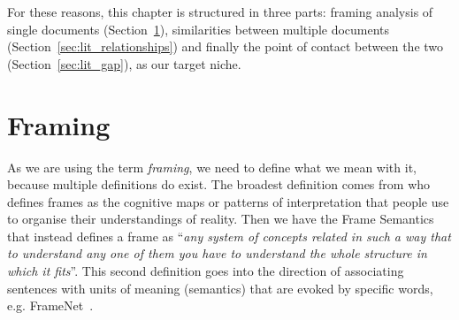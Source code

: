 
For these reasons, this chapter is structured in three parts: framing analysis of single documents (Section~\ref{sec:lit_framing}), similarities between multiple documents (Section~\ref{sec:lit_relationships}) and finally the point of contact between the two (Section~\ref{sec:lit_gap}), as our target niche.


\section{Framing}
\label{sec:lit_framing}

As we are using the term \emph{framing}, we need to define what we mean with it, because multiple definitions do exist.
The broadest definition comes from \citet{goffman1974frame} who defines frames as
the cognitive maps or patterns of interpretation that people use to organise their understandings of reality.
Then we have the Frame Semantics~\cite{fillmore2006frame} that instead defines a frame as ``\textit{any system of concepts related in such a way that to understand any one of them you have to understand the whole structure in which it fits}''. This second definition goes into the direction of associating sentences with units of meaning (semantics) that are evoked by specific words, e.g. FrameNet~\cite{baker1998berkeley}.

